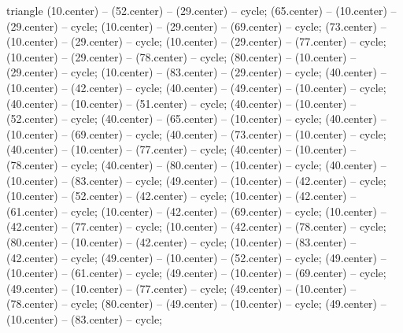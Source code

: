 \begin{pgfonlayer}{triangle}
 (10.center) -- (52.center) -- (29.center) -- cycle; 
 (65.center) -- (10.center) -- (29.center) -- cycle; 
 (10.center) -- (29.center) -- (69.center) -- cycle; 
 (73.center) -- (10.center) -- (29.center) -- cycle; 
 (10.center) -- (29.center) -- (77.center) -- cycle; 
 (10.center) -- (29.center) -- (78.center) -- cycle; 
 (80.center) -- (10.center) -- (29.center) -- cycle; 
 (10.center) -- (83.center) -- (29.center) -- cycle; 
 (40.center) -- (10.center) -- (42.center) -- cycle; 
 (40.center) -- (49.center) -- (10.center) -- cycle; 
 (40.center) -- (10.center) -- (51.center) -- cycle; 
 (40.center) -- (10.center) -- (52.center) -- cycle; 
 (40.center) -- (65.center) -- (10.center) -- cycle; 
 (40.center) -- (10.center) -- (69.center) -- cycle; 
 (40.center) -- (73.center) -- (10.center) -- cycle; 
 (40.center) -- (10.center) -- (77.center) -- cycle; 
 (40.center) -- (10.center) -- (78.center) -- cycle; 
 (40.center) -- (80.center) -- (10.center) -- cycle; 
 (40.center) -- (10.center) -- (83.center) -- cycle; 
 (49.center) -- (10.center) -- (42.center) -- cycle; 
 (10.center) -- (52.center) -- (42.center) -- cycle; 
 (10.center) -- (42.center) -- (61.center) -- cycle; 
 (10.center) -- (42.center) -- (69.center) -- cycle; 
 (10.center) -- (42.center) -- (77.center) -- cycle; 
 (10.center) -- (42.center) -- (78.center) -- cycle; 
 (80.center) -- (10.center) -- (42.center) -- cycle; 
 (10.center) -- (83.center) -- (42.center) -- cycle; 
 (49.center) -- (10.center) -- (52.center) -- cycle; 
 (49.center) -- (10.center) -- (61.center) -- cycle; 
 (49.center) -- (10.center) -- (69.center) -- cycle; 
 (49.center) -- (10.center) -- (77.center) -- cycle; 
 (49.center) -- (10.center) -- (78.center) -- cycle; 
 (80.center) -- (49.center) -- (10.center) -- cycle; 
 (49.center) -- (10.center) -- (83.center) -- cycle; 

\end{pgfonlayer}
